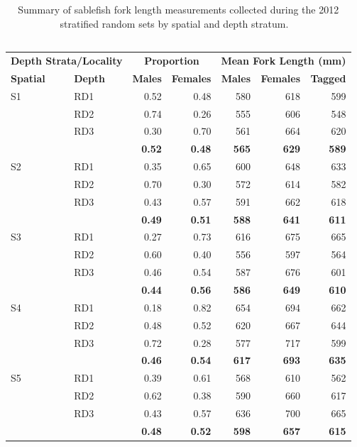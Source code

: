 \documentclass[12pt]{article}\usepackage[]{graphicx}\usepackage[]{color}
\begin{document}
\begin{table}[!h]

\caption{\label{tab:table6}Summary of sablefish fork length measurements collected during the 2012 stratified random sets by spatial and depth stratum. ~\\
\hspace*{0.333em}\\}
\fontsize{9}{11}\selectfont
\begin{tabular}[t]{llrrrrr}
\toprule
\multicolumn{2}{c}{\textbf{Depth Strata/Locality}} & \multicolumn{2}{c}{\textbf{Proportion}} & \multicolumn{3}{c}{\textbf{Mean Fork Length (mm)}} \\
\cmidrule(l{3pt}r{3pt}){1-2} \cmidrule(l{3pt}r{3pt}){3-4} \cmidrule(l{3pt}r{3pt}){5-7}
\textbf{Spatial} & \textbf{Depth} & \textbf{Males} & \textbf{Females} & \textbf{Males} & \textbf{Females} & \textbf{Tagged}\\
\midrule
S1 & RD1 & 0.52 & 0.48 & 580 & 618 & 599\\
 & RD2 & 0.74 & 0.26 & 555 & 606 & 548\\
 & RD3 & 0.30 & 0.70 & 561 & 664 & 620\\
\midrule
\textbf{} & \textbf{} & \textbf{0.52} & \textbf{0.48} & \textbf{565} & \textbf{629} & \textbf{589}\\
\midrule
S2 & RD1 & 0.35 & 0.65 & 600 & 648 & 633\\
 & RD2 & 0.70 & 0.30 & 572 & 614 & 582\\
 & RD3 & 0.43 & 0.57 & 591 & 662 & 618\\
\midrule
\textbf{} & \textbf{} & \textbf{0.49} & \textbf{0.51} & \textbf{588} & \textbf{641} & \textbf{611}\\
\midrule
S3 & RD1 & 0.27 & 0.73 & 616 & 675 & 665\\
 & RD2 & 0.60 & 0.40 & 556 & 597 & 564\\
 & RD3 & 0.46 & 0.54 & 587 & 676 & 601\\
\midrule
\textbf{} & \textbf{} & \textbf{0.44} & \textbf{0.56} & \textbf{586} & \textbf{649} & \textbf{610}\\
\midrule
S4 & RD1 & 0.18 & 0.82 & 654 & 694 & 662\\
 & RD2 & 0.48 & 0.52 & 620 & 667 & 644\\
 & RD3 & 0.72 & 0.28 & 577 & 717 & 599\\
\midrule
\textbf{} & \textbf{} & \textbf{0.46} & \textbf{0.54} & \textbf{617} & \textbf{693} & \textbf{635}\\
\midrule
S5 & RD1 & 0.39 & 0.61 & 568 & 610 & 562\\
 & RD2 & 0.62 & 0.38 & 590 & 660 & 617\\
 & RD3 & 0.43 & 0.57 & 636 & 700 & 665\\
\midrule
\textbf{} & \textbf{} & \textbf{0.48} & \textbf{0.52} & \textbf{598} & \textbf{657} & \textbf{615}\\
\bottomrule
\end{tabular}
\end{table}
\clearpage
\end{document}
